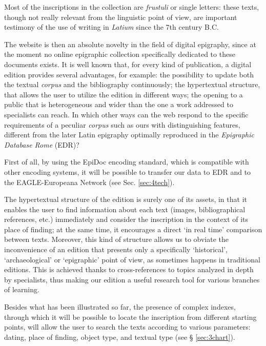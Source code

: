 \documentclass[amsthm,ebook]{saparticle}
\begin{document}
Most of the inscriptions in the collection are \emph{frustuli} or single letters: these texts, though not really relevant from
the linguistic point of view, are important testimony of the use of writing in \emph{Latium} since the 7th century B.C. 

The website is then an absolute novelty in the field of digital epigraphy, since at the moment no online epigraphic
collection specifically dedicated to these documents exists. It is well known that, for every kind of publication, a
digital edition provides several advantages, for example: the possibility to update both the textual \emph{corpus} and the
bibliography continuously; the hypertextual structure, that allows the user to utilize the edition in different ways;
the opening to a public that is heterogeneous and wider than the one a work addressed to specialists can reach. In
which other ways can the web respond to the specific requirements of a peculiar \emph{corpus} such as ours with distinguishing
features, different from the later Latin epigraphy optimally reproduced in the \emph{Epigraphic Database Rome} (EDR)?

First of all, by using the EpiDoc encoding standard, which is compatible with other encoding systems, it will be
possible to transfer our data to EDR and to the EAGLE-Europeana Network (see Sec. \ref{sec:4tech}).

The hypertextual structure of the edition is surely one of its assets, in that it enables the user to find information
about each text (images, bibliographical references, etc.) immediately and consider the inscription in the context of
its place of finding; at the same time, it encourages a direct `in real time' comparison between texts. Moreover,
this kind of structure allows us to obviate the inconvenience of an edition that presents only a specifically
`historical', `archaeological' or `epigraphic' point of view, as sometimes happens in traditional
editions. This is achieved thanks to cross-references to topics analyzed in depth by specialists, thus making our
edition a useful research tool for various branches of learning.

Besides what has been illustrated so far, the presence of complex indexes, through which it will be possible to locate
the inscription from different starting points, will allow the user to search the texts according to various
parameters: dating, place of finding, object type, and textual type (see § \ref{sec:3chart}). 
\end{document}
